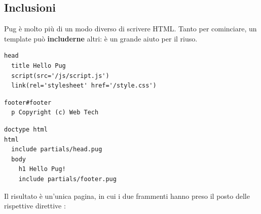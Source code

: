 \subsection{Inclusioni}

Pug è molto più di un modo diverso di scrivere HTML. Tanto per cominciare, un
template può \textbf{includerne} altri: è un grande aiuto per il riuso.

\begin{affianco}[0.55]
\begin{lstlisting}[style=pug, name=partials/head.pug]
head
  title Hello Pug
  script(src='/js/script.js')
  link(rel='stylesheet' href='/style.css')
\end{lstlisting}
\risultato
\begin{lstlisting}[style=pug, name=partials/footer.pug]
footer#footer
  p Copyright (c) Web Tech
\end{lstlisting}
\end{affianco}

\begin{affianco}[0.5][c]
\begin{lstlisting}[style=pug, name=index.pug]
doctype html
html
  include partials/head.pug
  body
    h1 Hello Pug!
    include partials/footer.pug
\end{lstlisting}
\risultato
\begin{immagine}
\end{immagine}
\end{affianco}

Il risultato è un'unica pagina, in cui i due frammenti hanno preso il posto
delle rispettive direttive :

